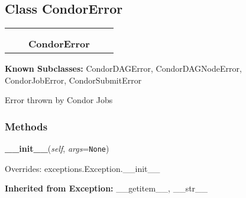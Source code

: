 \subsection{Class CondorError}

    \label{pipeline:CondorError}
\begin{tabular}{cccccc}
\multicolumn{2}{r}{\settowidth{\BCL}{exceptions.Exception}\multirow{2}{\BCL}{exceptions.Exception}}
&&
  \\\cline{3-3}
  &&\multicolumn{1}{c|}{}
&&
  \\
&&\multicolumn{2}{l}{\textbf{CondorError}}
\end{tabular}

\textbf{Known Subclasses:}
CondorDAGError,
    CondorDAGNodeError,
    CondorJobError,
    CondorSubmitError

Error thrown by Condor Jobs



  \subsubsection{Methods}

    \label{pipeline:CondorError:__init__}
    \vspace{0.5ex}

    \noindent\begin{boxedminipage}{\textwidth}

    \raggedright \textbf{\_\_init\_\_}(\textit{self}, \textit{args}=\texttt{N\-o\-n\-e\-})

      Overrides: exceptions.Exception.\_\_init\_\_

    \end{boxedminipage}

  \textbf{Inherited from Exception:}
    \_\_getitem\_\_,
    \_\_str\_\_


